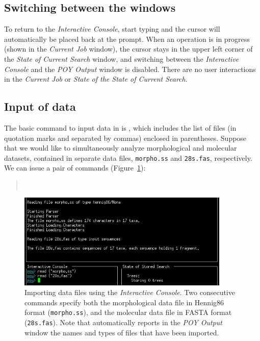 {\subsection{Switching between the windows}
To return to the \emph{Interactive Console}, start typing and the cursor will automatically be placed back at the \poy prompt. When an operation is in progress (shown in the \emph{Current Job} window), the cursor stays in the upper left corner of the \emph{State of Current Search} window, and switching between the \emph{Interactive Console} and the \emph{POY Output} window is disabled. There are no user interactions in the \emph{Current Job} or \emph{State of the State of Current Search}.

\subsection{Input of data} \label{sec:import}

The basic command to input data in \poy is , which includes the list of files (in quotation marks and separated by commas) enclosed in parentheses. Suppose that we would like to simultaneously analyze morphological and molecular datasets, contained in separate data files, \texttt{morpho.ss} and \texttt{28s.fas}, respectively. We can issue a pair of  commands (Figure~\ref{fig:readingexample}):
\begin{quote}
        \\
\end{quote}

\begin{figure}
    \begin{center}
        \includegraphics[width=0.9\textwidth]{doc/figures/reading_example.jpg}
    \end{center}
    \caption{Importing data files using the \emph{Interactive Console}. Two consecutive  commands specify both the morphological data file in Hennig86 format (\texttt{morpho.ss}), and the molecular data file in FASTA format (\texttt{28s.fas}). Note that \poy automatically reports  in the \emph{POY Output} window the names and types of files that have been imported.}
    \label{fig:readingexample}
\end{figure}

}
